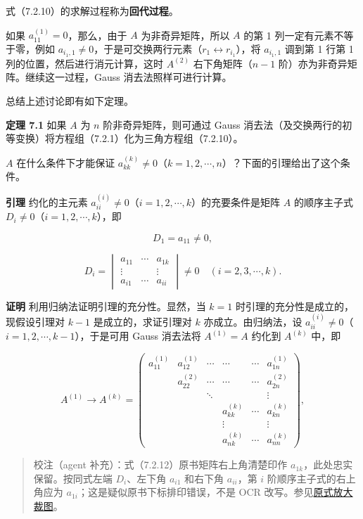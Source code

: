\documentclass[
  10pt,
  fontset=fandol]{ctexart}
\begin{document}
式（7.2.10）的求解过程称为\textbf{回代过程}。

如果 \(a_{11}^{(1)}=0\)，那么，由于 \(A\) 为非奇异矩阵，所以 \(A\) 的第 1 列一定有元素不等于零，例如 \(a_{i_1,1}\ne0\)，于是可交换两行元素（\(r_1\leftrightarrow r_{i_1}\)），将 \(a_{i_1,1}\) 调到第 1 行第 1 列的位置，然后进行消元计算，这时 \(A^{(2)}\) 右下角矩阵（\(n-1\) 阶）亦为非奇异矩阵。继续这一过程，Gauss 消去法照样可进行计算。

总结上述讨论即有如下定理。

\textbf{定理 7.1} 如果 \(A\) 为 \(n\) 阶非奇异矩阵，则可通过 Gauss 消去法（及交换两行的初等变换）将方程组（7.2.1）化为三角方程组（7.2.10）。

\(A\) 在什么条件下才能保证 \(a_{kk}^{(k)}\ne0\)（\(k=1,2,\cdots,n\)）？下面的引理给出了这个条件。

\textbf{引理} 约化的主元素 \(a_{ii}^{(i)}\ne0\)（\(i=1,2,\cdots,k\)）的充要条件是矩阵 \(A\) 的顺序主子式 \(D_i\ne0\)（\(i=1,2,\cdots,k\)），即

\[D_1=a_{11}\ne0,\]

\[
D_i=\begin{vmatrix}
a_{11}&\cdots&a_{1k}\\
\vdots&&\vdots\\
a_{i1}&\cdots&a_{ii}
\end{vmatrix}\ne0\quad(i=2,3,\cdots,k).
\tag{7.2.12}
\]

\textbf{证明} 利用归纳法证明引理的充分性。显然，当 \(k=1\) 时引理的充分性是成立的，现假设引理对 \(k-1\) 是成立的，求证引理对 \(k\) 亦成立。由归纳法，设 \(a_{ii}^{(i)}\ne0\)（\(i=1,2,\cdots,k-1\)），于是可用 Gauss 消去法将 \(A^{(1)}=A\) 约化到 \(A^{(k)}\) 中，即

\[
A^{(1)}\to A^{(k)}=\begin{pmatrix}
a_{11}^{(1)}&a_{12}^{(1)}&\cdots&\cdots&\cdots&a_{1n}^{(1)}\\
&a_{22}^{(2)}&\cdots&\cdots&\cdots&a_{2n}^{(2)}\\
&&\ddots&&&\vdots\\
&&&a_{kk}^{(k)}&\cdots&a_{kn}^{(k)}\\
&&&\vdots&&\vdots\\
&&&a_{nk}^{(k)}&\cdots&a_{nn}^{(k)}
\end{pmatrix},
\]

\begin{quote}
校注（agent 补充）：式（7.2.12）原书矩阵右上角清楚印作 \(a_{1k}\)，此处忠实保留。按同式左端 \(D_i\)、左下角 \(a_{i1}\) 和右下角 \(a_{ii}\)，第 \(i\) 阶顺序主子式的右上角应为 \(a_{1i}\)；这是疑似原书下标排印错误，不是 OCR 改写。参见\href{../assets/ch07a/pdf-180-principal-minor-detail.png}{原式放大裁图}。
\end{quote}
\end{document}
